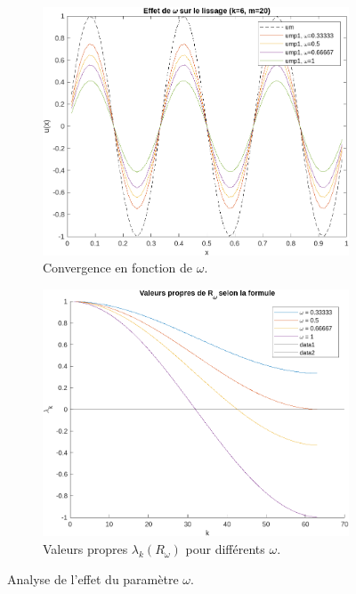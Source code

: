 \documentclass[12pt,a4paper]{article}
\begin{document}
\begin{figure}[H]
    \centering
    \begin{subfigure}{0.45\textwidth}
        \includegraphics[width=\textwidth]{src/omega.png}
        \caption{Convergence en fonction de $\omega$.}
        \label{fig:omega_convergence}
    \end{subfigure}
    \hfill
    \begin{subfigure}{0.45\textwidth}
        \includegraphics[width=\textwidth]{src/lambda_k.png}
        \caption{Valeurs propres $\lambda_k(R_\omega)$ pour différents $\omega$.}
        \label{fig:lambda_k}
    \end{subfigure}
    \caption{Analyse de l'effet du paramètre $\omega$.}
    \label{fig:omega_analysis}
\end{figure}
\end{document}
